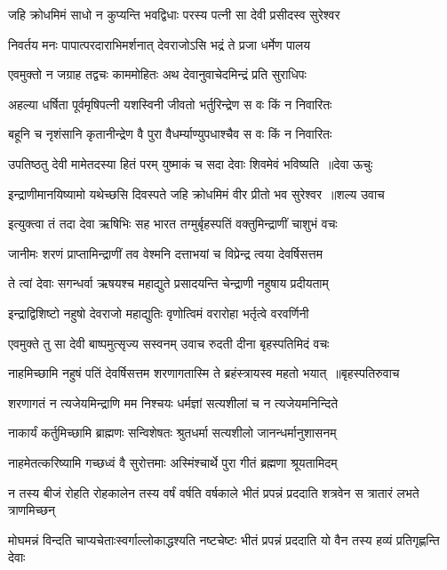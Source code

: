 \twolineshloka
{जहि क्रोधमिमं साधो न कुप्यन्ति भवद्विधाः}
{परस्य पत्नी सा देवी प्रसीदस्व सुरेश्वर}


\twolineshloka
{निवर्तय मनः पापात्परदाराभिमर्शनात्}
{देवराजोऽसि भद्रं ते प्रजा धर्मेण पालय}


\twolineshloka
{एवमुक्तो न जग्राह तद्वचः काममोहितः}
{अथ देवानुवाचेदमिन्द्रं प्रति सुराधिपः}


\twolineshloka
{अहल्या धर्षिता पूर्वमृषिपत्नी यशस्विनी}
{जीवतो भर्तुरिन्द्रेण स वः किं न निवारितः}


\twolineshloka
{बहूनि च नृशंसानि कृतानीन्द्रेण वै पुरा}
{वैधर्म्याण्युपधाश्चैव स वः किं न निवारितः}


\threelineshloka
{उपतिष्ठतु देवी मामेतदस्या हितं परम्}
{युष्माकं च सदा देवाः शिवमेवं भविष्यति ॥देवा ऊचुः}
{}


\threelineshloka
{इन्द्राणीमानयिष्यामो यथेच्छसि दिवस्पते}
{जहि क्रोधमिमं वीर प्रीतो भव सुरेश्वर ॥शल्य उवाच}
{}


\twolineshloka
{इत्युक्त्वा तं तदा देवा ऋषिभिः सह भारत}
{तग्मुर्बृहस्पतिं वक्तुमिन्द्राणीं चाशुभं वचः}


\twolineshloka
{जानीमः शरणं प्राप्तामिन्द्राणीं तव वेश्मनि}
{दत्ताभयां च विप्रेन्द्र त्वया देवर्षिसत्तम}


\twolineshloka
{ते त्वां देवाः सगन्धर्वा ऋषयश्च महाद्युते}
{प्रसादयन्ति चेन्द्राणी नहुषाय प्रदीयताम्}


\twolineshloka
{इन्द्राद्विशिष्टो नहुषो देवराजो महाद्युतिः}
{वृणोत्विमं वरारोहा भर्तृत्वे वरवर्णिनी}


\twolineshloka
{एवमुक्ते तु सा देवी बाष्पमुत्सृज्य सस्वनम्}
{उवाच रुदती दीना बृहस्पतिमिदं वचः}


\threelineshloka
{नाहमिच्छामि नहुषं पतिं देवर्षिसत्तम}
{शरणागतास्मि ते ब्रहंस्त्रायस्व महतो भयात् ॥बृहस्पतिरुवाच}
{}


\twolineshloka
{शरणागतं न त्यजेयमिन्द्राणि मम निश्चयः}
{धर्मज्ञां सत्यशीलां च न त्यजेयमनिन्दिते}


\twolineshloka
{नाकार्यं कर्तुमिच्छामि ब्राह्मणः सन्विशेषतः}
{श्रुतधर्मा सत्यशीलो जानन्धर्मानुशासनम्}


\twolineshloka
{नाहमेतत्करिष्यामि गच्छध्वं वै सुरोत्तमाः}
{अस्मिंश्चार्थे पुरा गीतं ब्रह्मणा श्रूयतामिदम्}


\twolineshloka
{न तस्य बीजं रोहति रोहकालेन तस्य वर्षं वर्षति वर्षकाले}
{भीतं प्रपन्नं प्रददाति शत्रवेन स त्रातारं लभते त्राणमिच्छन्}


\twolineshloka
{मोघमन्नं विन्दति चाप्यचेताःस्वर्गाल्लोकाद्धश्यति नष्टचेष्टः}
{भीतं प्रपन्नं प्रददाति यो वैन तस्य हव्यं प्रतिगृह्णन्ति देवाः}


